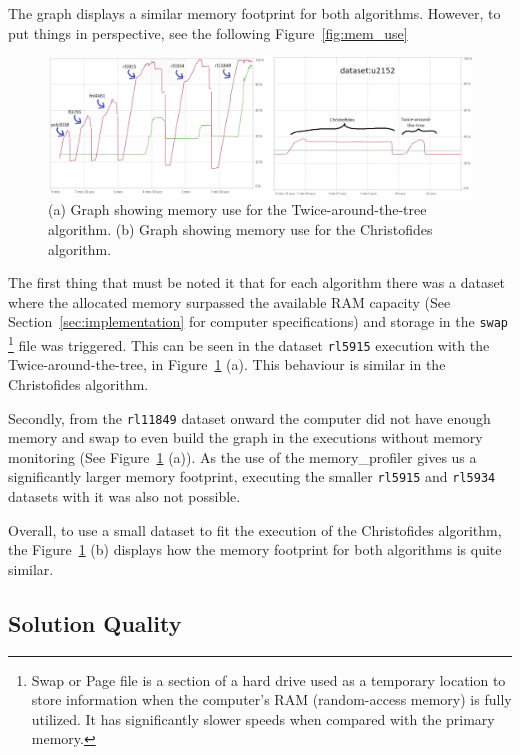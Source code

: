 \documentclass[12pt]{article}
\begin{document}
The graph displays a similar memory footprint for both algorithms. However, to put things in perspective, 
see the following Figure~\ref{fig:mem_use} 

\begin{figure}[ht]
\centering
\includegraphics[height=.325\textheight]{memory_profile_comparison.png}
\caption{(a) Graph showing memory use for the Twice-around-the-tree algorithm. (b) Graph showing memory use for the Christofides algorithm.}
\label{fig:memory_behaviour}
\end{figure}

The first thing that must be noted it that for each algorithm there was a dataset where the allocated memory surpassed 
the available RAM capacity (See Section~\ref{sec:implementation} for computer specifications) and storage in the \texttt{swap}
\footnote{Swap or Page file is a section of a hard drive used as a temporary location to store information 
when the computer's RAM (random-access memory) is fully utilized. It has significantly slower speeds when 
compared with the primary memory.} 
file was triggered. This can be seen in the dataset \texttt{rl5915} execution with the Twice-around-the-tree, 
in Figure~\ref{fig:memory_behaviour} (a). This behaviour is similar in the Christofides algorithm.

Secondly, from the \texttt{rl11849} dataset onward the computer did not have enough memory and swap to 
even build the graph in the executions without memory monitoring (See Figure~\ref{fig:memory_behaviour} (a)). 
As the use of the memory\_profiler gives us a significantly larger memory footprint, executing the smaller 
\texttt{rl5915} and \texttt{rl5934} datasets with it was also not possible.

Overall, to use a small dataset to fit the execution of the Christofides algorithm, the Figure~\ref{fig:memory_behaviour} (b) 
displays how the memory footprint for both algorithms is quite similar.

\subsection{Solution Quality} \label{sec:exp_quality}
\end{document}
